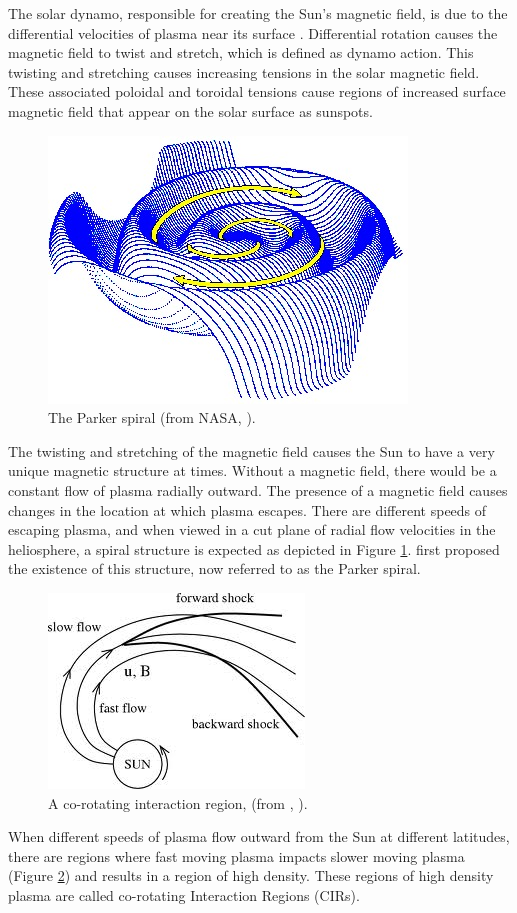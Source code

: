 The solar dynamo, responsible for creating the Sun's magnetic field, is
due to the differential velocities of plasma near its surface
\citep{Kulsrud}. Differential rotation causes the magnetic field to twist and
stretch, which is defined as dynamo action. This
twisting and stretching causes increasing tensions in the solar magnetic field.
These associated poloidal and toroidal tensions cause
regions of increased surface magnetic field that appear on the solar surface as
sunspots.

\begin{figure}
	\centering
	\includegraphics[scale=0.3]{images/parker.jpg}
	\caption{The Parker spiral (from NASA, \citeyear{ParkerSpiral}).}
	\label{fig:NASAParkerSpiral}
	\figSpace
\end{figure}
The twisting and stretching of the magnetic field causes the Sun to have a very
unique magnetic structure at times. Without a magnetic field, there would be a
constant flow of plasma radially outward. The presence of a magnetic field
causes changes in the location at which plasma escapes. There are different speeds of escaping plasma, and when
viewed in a cut plane of radial flow velocities in the heliosphere, a spiral
structure is expected as depicted in Figure \ref{fig:NASAParkerSpiral}.
\citet{Parker1958} first proposed the existence of this structure, now referred to 
as the Parker spiral.
\begin{figure}
	\centering
	\includegraphics[scale=0.6]{images/CIR.jpeg}
	\caption{A co-rotating interaction region, (from \citeauthor{Volk2004},
	\citeyear{Volk2004}).}
	\label{fig:VolkCIR}
	\figSpace
\end{figure}
When different speeds of plasma flow outward from the Sun at different
latitudes, there are regions where fast moving plasma impacts slower moving
plasma (Figure \ref{fig:VolkCIR}) and results in a region of high density. These
regions of high density plasma are called co-rotating Interaction Regions (CIRs).

